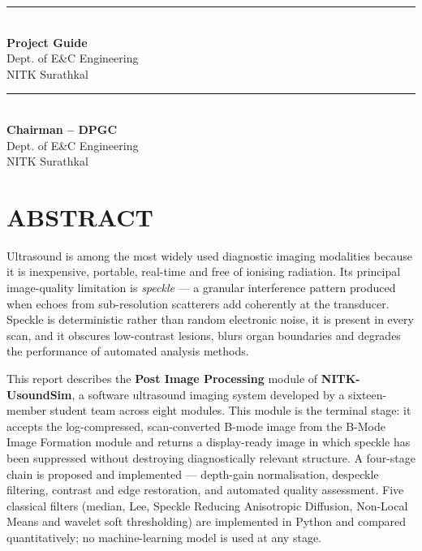 \documentclass[12pt,a4paper,oneside]{report}
\begin{document}
\vspace{1.6cm}
\noindent
\begin{minipage}[t]{0.48\textwidth}
\rule{5cm}{0.4pt}\\
\textbf{Project Guide}\\
Dept. of E\&C Engineering\\
NITK Surathkal
\end{minipage}\hfill
\begin{minipage}[t]{0.48\textwidth}
\rule{5cm}{0.4pt}\\
\textbf{Chairman -- DPGC}\\
Dept. of E\&C Engineering\\
NITK Surathkal
\end{minipage}

\chapter*{ABSTRACT}
\thispagestyle{plain}

Ultrasound is among the most widely used diagnostic imaging modalities because it
is inexpensive, portable, real-time and free of ionising radiation. Its principal
image-quality limitation is \emph{speckle} --- a granular interference pattern
produced when echoes from sub-resolution scatterers add coherently at the
transducer. Speckle is deterministic rather than random electronic noise, it is
present in every scan, and it obscures low-contrast lesions, blurs organ
boundaries and degrades the performance of automated analysis methods.

This report describes the \textbf{Post Image Processing} module of
\textbf{NITK-UsoundSim}, a software ultrasound imaging system developed by a
sixteen-member student team across eight modules. This module is the terminal
stage: it accepts the log-compressed, scan-converted B-mode image from the B-Mode
Image Formation module and returns a display-ready image in which speckle has
been suppressed without destroying diagnostically relevant structure. A
four-stage chain is proposed and implemented --- depth-gain normalisation,
despeckle filtering, contrast and edge restoration, and automated quality
assessment. Five classical filters (median, Lee, Speckle Reducing Anisotropic
Diffusion, Non-Local Means and wavelet soft thresholding) are implemented in
Python and compared quantitatively; no machine-learning model is used at any
stage.
\end{document}
